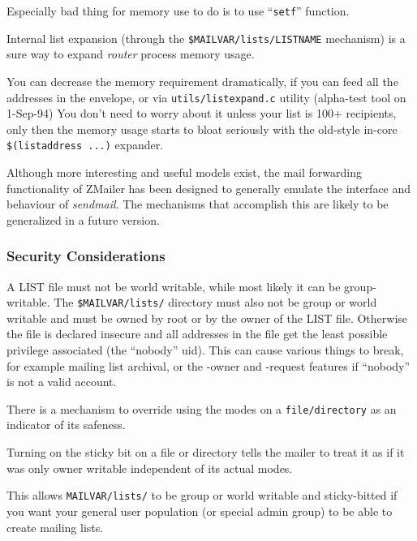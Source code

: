 Especially bad thing for memory use to do is to use ``{\tt setf}'' function.

Internal list expansion (through the  {\tt \$MAILVAR/lists/LISTNAME} 
mechanism) is a sure way to expand {\em router} process memory usage.

You can decrease the memory requirement dramatically, if you can
feed all the addresses in the envelope, or via {\tt utils/listexpand.c}
utility (alpha-test tool on 1-Sep-94) You don't need to worry about 
it unless your list is 100+ recipients, only then the memory usage starts 
to bloat seriously with the old-style in-core {\tt \$(listaddress ...)} 
expander.

Although more interesting and useful models exist, the mail forwarding
functionality of ZMailer has been designed to generally emulate the
interface and behaviour of {\em sendmail}.
The mechanisms that accomplish this are likely to be generalized in
a future version.


\subsubsection{Security Considerations}



A LIST file must not be world writable, while most likely it can be
group-writable.
The {\tt \$MAILVAR/lists/} directory must also not be group or world
writable and must be owned by root or by the owner of the LIST file.
Otherwise the file is declared insecure and all addresses in the file
get the least possible privilege associated (the ``nobody'' uid).
This can cause various things to break, for example mailing list archival,
or the -owner and -request features if ``nobody'' is not a valid account.

There is a mechanism to override using the modes on a {\tt file/directory}
as an indicator of its safeness.

Turning on the sticky bit on a file or directory tells the mailer to treat
it as if it was only owner writable independent of its actual modes.

This allows {\tt MAILVAR/lists/} to be group or world writable and
sticky-bitted if you want your general user population (or special admin
group) to be able to create mailing lists.

